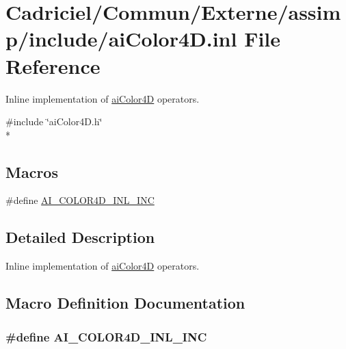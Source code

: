 \hypertarget{ai_color4_d_8inl}{\section{Cadriciel/\-Commun/\-Externe/assimp/include/ai\-Color4\-D.inl File Reference}
\label{ai_color4_d_8inl}
}


Inline implementation of \hyperlink{structai_color4_d}{ai\-Color4\-D} operators.  


{\ttfamily \#include \char`\"{}ai\-Color4\-D.\-h\char`\"{}}\\*
\subsection*{Macros}
\begin{DoxyCompactItemize}
\item 
\#define \hyperlink{ai_color4_d_8inl_a77423de67c2c45745a4a79741ad8a4b1}{A\-I\-\_\-\-C\-O\-L\-O\-R4\-D\-\_\-\-I\-N\-L\-\_\-\-I\-N\-C}
\end{DoxyCompactItemize}


\subsection{Detailed Description}
Inline implementation of \hyperlink{structai_color4_d}{ai\-Color4\-D} operators. 

\subsection{Macro Definition Documentation}
\hypertarget{ai_color4_d_8inl_a77423de67c2c45745a4a79741ad8a4b1}{
\subsubsection[{A\-I\-\_\-\-C\-O\-L\-O\-R4\-D\-\_\-\-I\-N\-L\-\_\-\-I\-N\-C}]{\setlength{\rightskip}{0pt plus 5cm}\#define A\-I\-\_\-\-C\-O\-L\-O\-R4\-D\-\_\-\-I\-N\-L\-\_\-\-I\-N\-C}}\label{ai_color4_d_8inl_a77423de67c2c45745a4a79741ad8a4b1}
